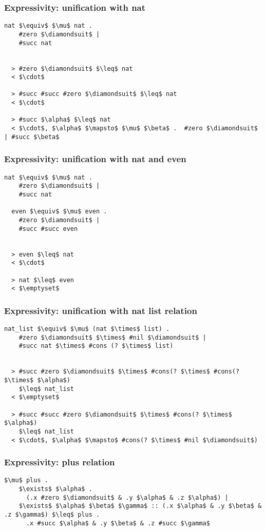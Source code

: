 \documentclass{beamer}
\begin{document}
\begin{frame}[fragile]
  \frametitle{Expressivity: unification with nat}

  \begin{lstlisting}[]
  nat $\equiv$ $\mu$ nat .
    #zero $\diamondsuit$ | 
    #succ nat


  > #zero $\diamondsuit$ $\leq$ nat 
  < $\cdot$

  > #succ #succ #zero $\diamondsuit$ $\leq$ nat 
  < $\cdot$

  > #succ $\alpha$ $\leq$ nat 
  < $\cdot$, $\alpha$ $\mapsto$ $\mu$ $\beta$ .  #zero $\diamondsuit$ | #succ $\beta$
  \end{lstlisting} 

\end{frame}

\begin{frame}[fragile]
  \frametitle{Expressivity: unification with nat and even}

  \begin{lstlisting}[]
  nat $\equiv$ $\mu$ nat .
    #zero $\diamondsuit$ | 
    #succ nat

  even $\equiv$ $\mu$ even .
    #zero $\diamondsuit$ | 
    #succ #succ even 


  > even $\leq$ nat 
  < $\cdot$

  > nat $\leq$ even 
  < $\emptyset$
  \end{lstlisting} 

\end{frame}


\begin{frame}[fragile]
  \frametitle{Expressivity: unification with nat list relation}

  \begin{lstlisting}[]
  nat_list $\equiv$ $\mu$ (nat $\times$ list) .
    #zero $\diamondsuit$ $\times$ #nil $\diamondsuit$ | 
    #succ nat $\times$ #cons (? $\times$ list)


  > #succ #zero $\diamondsuit$ $\times$ #cons(? $\times$ #cons(? $\times$ $\alpha$) 
    $\leq$ nat_list
  < $\emptyset$

  > #succ #succ #zero $\diamondsuit$ $\times$ #cons(? $\times$ $\alpha$) 
    $\leq$ nat_list
  < $\cdot$, $\alpha$ $\mapsto$ #cons(? $\times$ #nil $\diamondsuit$)
  \end{lstlisting} 
\end{frame}


\begin{frame}[fragile]
  \frametitle{Expressivity: plus relation}

  \begin{lstlisting}[]
  $\mu$ plus .
    $\exists$ $\alpha$ . 
      (.x #zero $\diamondsuit$ & .y $\alpha$ & .z $\alpha$) |
    $\exists$ $\alpha$ $\beta$ $\gamma$ :: (.x $\alpha$ & .y $\beta$ & .z $\gamma$) $\leq$ plus . 
      .x #succ $\alpha$ & .y $\beta$ & .z #succ $\gamma$
  \end{lstlisting}
\end{frame}
\end{document}

